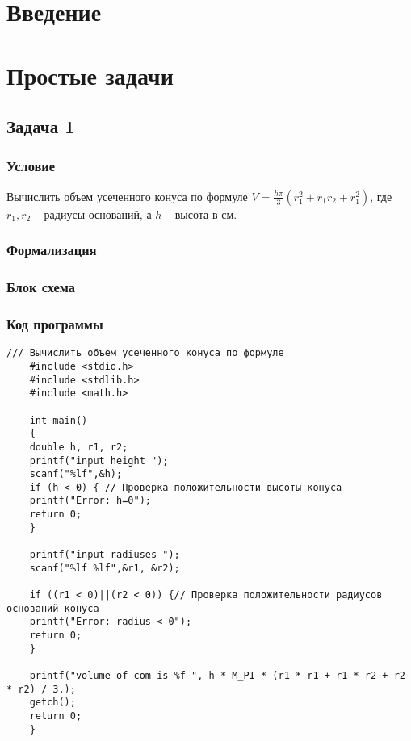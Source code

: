 \documentclass[simple,14pt]{eskdtext}
\begin{document}
	\maketitle
	
	\tableofcontents
	\newpage
	\section*{Введение}
	\newpage
	\section{Простые задачи}
	
	\subsection{Задача 1}
	\subsubsection{Условие}
	Вычислить объем усеченного конуса по формуле $ V = \frac{h\pi}{3}(r_1^2+r_1 r_2 +r_1^2) $, где $ r_1, r_2$ -- радиусы оснований, а $h$ -- высота в см.
	\subsubsection{Формализация}
	\subsubsection{Блок схема}
	\subsubsection{Код программы}
	\begin{lstlisting}[label=some-code1,caption=Задача 1]
	/// Вычислить объем усеченного конуса по формуле
	#include <stdio.h>
	#include <stdlib.h>
	#include <math.h>
		
	int main()
	{
	double h, r1, r2;
	printf("input height ");
	scanf("%lf",&h);
	if (h < 0) { // Проверка положительности высоты конуса
	printf("Error: h=0");
	return 0;
	}
		
	printf("input radiuses ");
	scanf("%lf %lf",&r1, &r2);
		
	if ((r1 < 0)||(r2 < 0)) {// Проверка положительности радиусов оснований конуса
	printf("Error: radius < 0");
	return 0;
	}
		
	printf("volume of com is %f ", h * M_PI * (r1 * r1 + r1 * r2 + r2 * r2) / 3.);
	getch();
	return 0;
	}
	\end{lstlisting}
\end{document}
